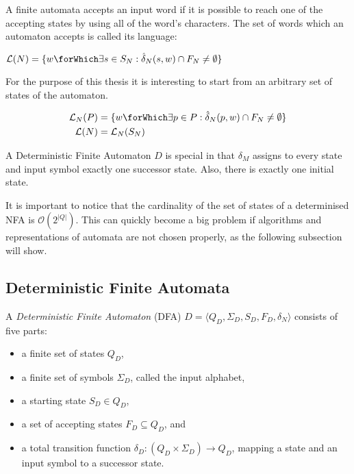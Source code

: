A finite automata accepts an input word if it is possible to reach one of the
accepting states by using all of the word's characters.
The set of words which an automaton accepts is called its language:

\begin{definition}
  $\mathcal{L}(N) = \{ w \forWhich \exists s \in S_N: \hat{\delta}_N(s, w) \cap F_N \neq \emptyset \}$
\end{definition}

For the purpose of this thesis it is interesting to start from an arbitrary set of states of the automaton.

\begin{definition}
  \begin{align*}
    \mathcal{L}_N(P) &= \{ w \forWhich \exists p \in P: \hat{\delta}_N(p, w) \cap F_N \neq \emptyset\}\\
    \mathcal{L}(N) &= \mathcal{L}_N(S_N)
  \end{align*}
\end{definition}

A Deterministic Finite Automaton $D$ is special in that $\delta_M$ assigns to
every state and input symbol exactly one successor state.
Also, there is exactly one initial state.

It is important to notice that the cardinality of the set of states of a
determinised NFA is $\mathcal{O}(2^{|Q|})$.
This can quickly become a big problem if algorithms and representations of
automata are not chosen properly, as the following subsection will show.


\subsection{Deterministic Finite Automata}

\begin{definition}
  A \emph{Deterministic Finite Automaton} (DFA)
  $D = \langle Q_D, \Sigma_D, S_D, F_D, \delta_N \rangle$
  consists of five parts:

  \begin{itemize}
    \item a finite set of states $Q_D$,
    \item a finite set of symbols $\Sigma_D$, called the input alphabet,
    \item a starting state $S_D \in Q_D$,
    \item a set of accepting states $F_D \subseteq Q_D$, and
    \item a total transition function
            $\delta_D : (Q_D \times \Sigma_D) \to Q_D$,
             mapping a state and an input symbol to a successor state.
  \end{itemize}

\end{definition}

